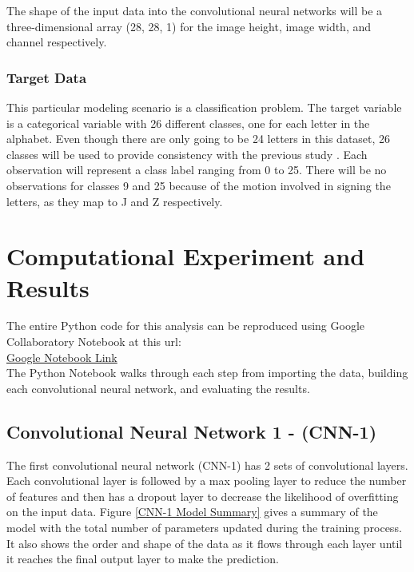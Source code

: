 \documentclass[5p,authoryear]{elsarticle}
\begin{document}
The shape of the input data into the convolutional neural networks will be a three-dimensional array (28, 28, 1) for the image height, image width, and channel respectively. 


\subsubsection{Target Data}

This particular modeling scenario is a classification problem. The target variable is a categorical variable with 26 different classes, one for each letter in the alphabet. Even though there are only going to be 24 letters in this dataset, 26 classes will be used to provide consistency with the previous study \citep{jason}. Each observation will represent a class label ranging from 0 to 25. There will be no observations for classes 9 and 25 because of the motion involved in signing the letters, as they map to J and Z respectively.


\section{Computational Experiment and Results}

The entire Python code for this analysis can be reproduced using Google Collaboratory Notebook at this url:\\

\href{https://colab.research.google.com/drive/10ejuNMf8NtyPXp5em7h-BDD0HYWerJeA}{Google Notebook Link} \\


The Python Notebook walks through each step from importing the data, building each convolutional neural network, and evaluating the results.   \\



\subsection{Convolutional Neural Network 1 - (CNN-1)}

The first convolutional neural network (CNN-1) has 2 sets of convolutional layers. Each convolutional layer is followed by a max pooling layer to reduce the number of features and then has a dropout layer to decrease the likelihood of overfitting on the input data. Figure \ref{CNN-1 Model Summary} gives a summary of the model with the total number of parameters updated during the training process. It also shows the order and shape of the data as it flows through each layer until it reaches the final output layer to make the prediction.
\end{document}
